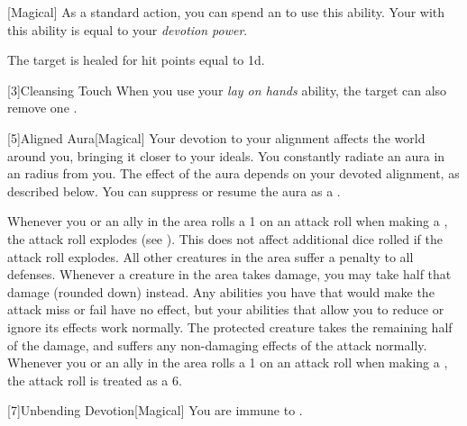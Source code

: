         [Magical] As a standard action, you can spend an  to use this ability.
        Your  with this ability is equal to your \textit{devotion power}.
        \begin{ability}
            \begin{spelltargetinginfo}
            \end{spelltargetinginfo}
            \begin{spelleffects}
                \spelleffect The target is healed for hit points equal to  \plus1d.
            \end{spelleffects}
        \end{ability}

        [3]{Cleansing Touch} When you use your \textit{lay on hands} ability, the target can also remove one .

        [5]{Aligned Aura}[Magical]
        Your devotion to your alignment affects the world around you, bringing it closer to your ideals.
        You constantly radiate an aura in an \areamed radius  from you.
        The effect of the aura depends on your devoted alignment, as described below.
        You can suppress or resume the aura as a .

         Whenever you or an ally in the area rolls a 1 on an attack roll when making a , the attack roll explodes (see ).
        This does not affect additional dice rolled if the attack roll explodes.
         All other creatures in the area suffer a  penalty to all defenses.
         Whenever a creature in the area takes damage, you may take half that damage (rounded down) instead.
        Any abilities you have that would make the attack miss or fail have no effect, but your abilities that allow you to reduce or ignore its effects work normally.
        The protected creature takes the remaining half of the damage, and suffers any non-damaging effects of the attack normally.
         Whenever you or an ally in the area rolls a 1 on an attack roll when making a , the attack roll is treated as a 6.

        [7]{Unbending Devotion}[Magical]
        You are immune to  .

